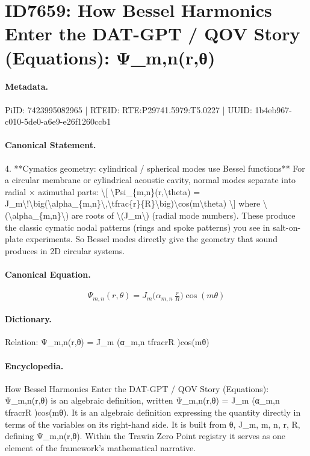 \section*{ID7659: How Bessel Harmonics Enter the DAT-GPT / QOV Story (Equations): Ψ\_m,n(r,θ)}
\paragraph{Metadata.}
PiID: 7423995082965 | RTEID: RTE:P29741.5979:T5.0227 | UUID: 1b4eb967-c010-5de0-a6e9-e26f1260ccb1

\paragraph{Canonical Statement.}
4. **Cymatics geometry: cylindrical / spherical modes use Bessel functions** For a circular membrane or cylindrical acoustic cavity, normal modes separate into radial × azimuthal parts: \textbackslash{}[ \textbackslash{}Psi\_\{m,n\}(r,\textbackslash{}theta) = J\_m\textbackslash{}!\textbackslash{}big(\textbackslash{}alpha\_\{m,n\}\textbackslash{},\textbackslash{}tfrac\{r\}\{R\}\textbackslash{}big)\textbackslash{}cos(m\textbackslash{}theta) \textbackslash{}] where \textbackslash{}(\textbackslash{}alpha\_\{m,n\}\textbackslash{}) are roots of \textbackslash{}(J\_m\textbackslash{}) (radial mode numbers). These produce the classic cymatic nodal patterns (rings and spoke patterns) you see in salt-on-plate experiments. So Bessel modes directly give the geometry that sound produces in 2D circular systems.

\paragraph{Canonical Equation.}
\[
\Psi_{m,n}(r,\theta) = J_m\!\big(\alpha_{m,n}\,\tfrac{r}{R}\big)\cos(m\theta)
\]

\paragraph{Dictionary.}
Relation: Ψ\_m,n(r,θ) = J\_m (α\_m,n tfracrR )cos(mθ)

\paragraph{Encyclopedia.}
How Bessel Harmonics Enter the DAT-GPT / QOV Story (Equations): Ψ\_m,n(r,θ) is an algebraic definition, written Ψ\_m,n(r,θ) = J\_m (α\_m,n tfracrR )cos(mθ). It is an algebraic definition expressing the quantity directly in terms of the variables on its right-hand side. It is built from θ, J\_m, m, n, r, R, defining Ψ\_m,n(r,θ). Within the Trawin Zero Point registry it serves as one element of the framework's mathematical narrative.
